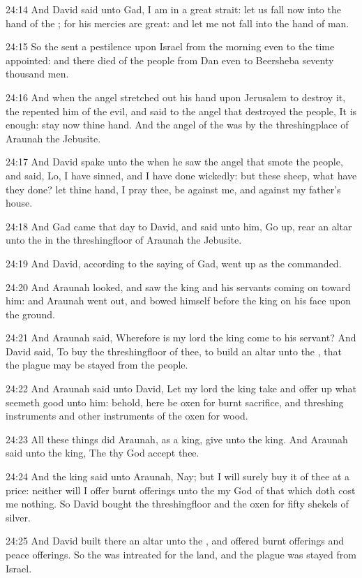 24:14 And David said unto Gad, I am in a great strait: let us fall now
into the hand of the \LORD; for his mercies are great: and let me not
fall into the hand of man.

24:15 So the \LORD sent a pestilence upon Israel from the morning even
to the time appointed: and there died of the people from Dan even to
Beersheba seventy thousand men.

24:16 And when the angel stretched out his hand upon Jerusalem to
destroy it, the \LORD repented him of the evil, and said to the angel
that destroyed the people, It is enough: stay now thine hand. And the
angel of the \LORD was by the threshingplace of Araunah the Jebusite.

24:17 And David spake unto the \LORD when he saw the angel that smote
the people, and said, Lo, I have sinned, and I have done wickedly: but
these sheep, what have they done? let thine hand, I pray thee, be
against me, and against my father's house.

24:18 And Gad came that day to David, and said unto him, Go up, rear
an altar unto the \LORD in the threshingfloor of Araunah the Jebusite.

24:19 And David, according to the saying of Gad, went up as the \LORD
commanded.

24:20 And Araunah looked, and saw the king and his servants coming on
toward him: and Araunah went out, and bowed himself before the king on
his face upon the ground.

24:21 And Araunah said, Wherefore is my lord the king come to his
servant?  And David said, To buy the threshingfloor of thee, to build
an altar unto the \LORD, that the plague may be stayed from the people.

24:22 And Araunah said unto David, Let my lord the king take and offer
up what seemeth good unto him: behold, here be oxen for burnt
sacrifice, and threshing instruments and other instruments of the oxen
for wood.

24:23 All these things did Araunah, as a king, give unto the king. And
Araunah said unto the king, The \LORD thy God accept thee.

24:24 And the king said unto Araunah, Nay; but I will surely buy it of
thee at a price: neither will I offer burnt offerings unto the \LORD my
God of that which doth cost me nothing. So David bought the
threshingfloor and the oxen for fifty shekels of silver.

24:25 And David built there an altar unto the \LORD, and offered burnt
offerings and peace offerings. So the \LORD was intreated for the land,
and the plague was stayed from Israel.


